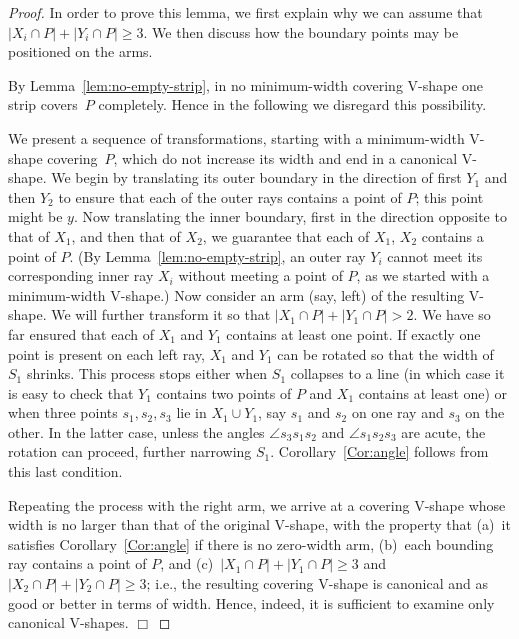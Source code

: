 \documentclass{llncs}
\begin{document}
\begin{proof}

In order to prove this lemma, we first explain why we can assume
that $|X_i\cap P|+|Y_i\cap P|\geq3$.  We then discuss how
the boundary points may be positioned on the arms.


By Lemma~\ref{lem:no-empty-strip}, in no minimum-width covering V-shape
one strip covers~$P$ completely.
Hence in the following we disregard this
possibility.

We present a sequence of transformations, starting with a minimum-width
V-shape covering~$P$, which do not
increase its width and end in a canonical V-shape.  We begin by
translating its outer boundary in the direction of first $Y_1$ and
then $Y_2$ to ensure that each of the outer rays contains a point of $P$;
this point might be $y$.  Now translating the inner boundary, first in
the direction opposite to that of $X_1$, and then that of $X_2$, we
guarantee that each of $X_1$, $X_2$ contains a point of $P$.  (By
Lemma~\ref{lem:no-empty-strip}, an outer ray $Y_i$ cannot meet its
corresponding inner ray $X_i$ without meeting a point of $P$, as we
started with a minimum-width V-shape.)  Now consider an arm (say,
left) of the resulting V-shape.  We will further transform it so that
$|X_1 \cap P| + |Y_1 \cap P|>2$.  We have so far ensured that each of
$X_1$ and $Y_1$ contains at least one point.  If exactly one point is
present on each left ray, $X_1$ and $Y_1$ can be rotated so that the
width of $S_1$ shrinks.  
This process stops either when $S_1$ collapses to a line (in which
case it is easy to check that $Y_1$ contains two points of $P$ and
$X_1$ contains at least one) or when three points $s_1,s_2,s_3$
lie in $X_1 \cup Y_1$, say $s_1$ and $s_2$ on one ray and $s_3$ on the
other.  In the latter case, unless the angles $\angle s_3 s_1 s_2$ and $\angle s_1 s_2
s_3$ are acute, the rotation can proceed, further narrowing $S_1$.
Corollary~\ref{Cor:angle} follows from this last condition.


Repeating the process with the right arm, we arrive at a covering
V-shape whose width is no larger than that of the original V-shape,
with the property that (a)~it satisfies Corollary~\ref{Cor:angle} if there is no zero-width arm,
(b)~each bounding ray contains a point of $P$, and (c)~$|X_1
\cap P| + |Y_1 \cap P| \geq 3$ and $|X_2 \cap P| + |Y_2 \cap P| \geq
3$; i.e., the resulting covering V-shape is canonical and as good or
better in terms of width.  Hence, indeed, it is sufficient to examine
only canonical V-shapes.  \hfill $\Box$

\end{proof}
\end{document}
